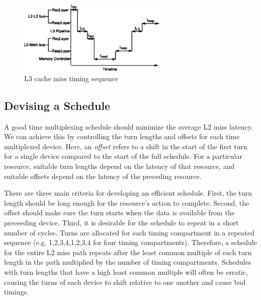 \begin{figure}
    \begin{center}
        \includegraphics[width=2.8in]{figs/miss_timing.eps}
        \caption{L3 cache miss timing sequence}
        \label{fig:miss_timing}
    \end{center}
\end{figure}

\subsection{Devising a Schedule}
A good time multiplexing schedule should minimize the average L2 miss latency.
We can achieve this by controlling the turn lengths and offsets for each 
time multiplexed device. Here, an \emph{offset} refers to a shift in the start 
of the first turn for a single device compared to the start of the full 
schedule.
For a particular resource, suitable turn lengths depend on the latency of that 
resource, and suitable offsets depend on the latency of the preceding resource. 


There are three main criteria for developing an efficient schedule.
First, the turn length should be long enough for the resource's action 
to complete. Second, the offset should make sure the turn starts when the data is 
available from the preceeding device.
Third, it is desirable for the schedule to repeat in a short number of cycles.
Turns are allocated for each timing compartment in a repeated sequence
(e.g. 1,2,3,4,1,2,3,4 for four timing compartments). Therefore, a schedule
for the entire L2 miss path repeats after the least common multiple of each turn
length in the path multiplied by the number of timing compartments. Schedules 
with turn lengths that have a high least common multiple will often be erratic, 
causing the turns of each device to shift relative to one another and cause bad 
timings.


